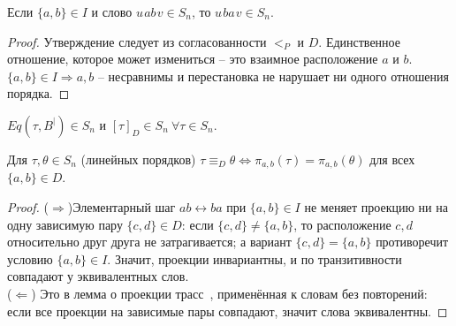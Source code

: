 \begin{lemma}
  Если $\{a, b\} \in I$ и слово $u\hspace{1pt}ab\hspace{1pt}v \in S_n$, то
  $u\hspace{1pt}ba\hspace{1pt}v \in S_n$.
  \label{lm:elem_swap}
\end{lemma}

\begin{proof}
  Утверждение следует из согласованности $<_P$ и $D$.
  Единственное отношение, которое может измениться -- это взаимное
  расположение $a$ и $b$.
  $\{a, b\} \in I \Rightarrow a, b \text{ -- несравнимы}$ и
  перестановка не нарушает ни одного отношения порядка.
\end{proof}
\begin{corollary}
  $Eq(\tau, B^|) \in S_n$ и $[\tau]_D \in S_n\ \forall \tau \in S_n$.
\end{corollary}

\begin{lemma}
  Для $\tau, \theta \in S_n$ (линейных порядков) $\tau
  \equiv_D \theta \iff \pi_{a, b}(\tau) = \pi_{a, b}(\theta)$
  для всех $\{a, b\} \in D$.
  \label{lm:proj_lemma}
\end{lemma}
\begin{proof}
  \hfill \break
  ($\Rightarrow$)Элементарный шаг $ab \leftrightarrow ba$ при
  $\{a, b\} \in I$ не меняет проекцию ни на одну зависимую пару
  $\{c,d\} \in D$: если $\{c,d\}  \neq \{a,b\}$, то расположение
  $c,d$ относительно друг друга не затрагивается; а вариант
  $\{c,d\}=\{a,b\}$ противоречит условию $\{a,b\} \in I$.
  Значит, проекции инвариантны, и по транзитивности совпадают у
  эквивалентных слов.\\
  ($\Leftarrow$) Это в лемма о проекции
  трасс~\cite{cori1985automates}, применённая к словам без
  повторений: если все проекции на зависимые пары совпадают, значит
  слова эквивалентны.
\end{proof}

